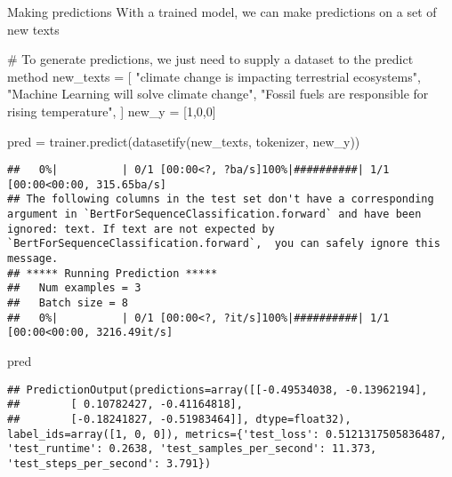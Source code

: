 \documentclass[
  10pt,
  ignorenonframetext,
  aspectratio=169]{beamer}
\newenvironment{Shaded}{\begin{snugshade}}{\end{snugshade}}
\newcommand{\CommentTok}[1]{\textcolor[rgb]{0.50,0.62,0.50}{#1}}
\newcommand{\DecValTok}[1]{\textcolor[rgb]{0.86,0.86,0.80}{#1}}
\newcommand{\NormalTok}[1]{\textcolor[rgb]{0.80,0.80,0.80}{#1}}
\newcommand{\OperatorTok}[1]{\textcolor[rgb]{0.94,0.94,0.82}{#1}}
\newcommand{\StringTok}[1]{\textcolor[rgb]{0.80,0.58,0.58}{#1}}
\begin{document}
\begin{frame}[fragile]{Making predictions}
\protect\hypertarget{making-predictions}{}
With a trained model, we can make predictions on a set of new texts

\medskip
\scriptsize

\begin{Shaded}
\begin{Highlighting}[]
\CommentTok{\# To generate predictions, we just need to supply a dataset to the predict method}
\NormalTok{new\_texts }\OperatorTok{=}\NormalTok{ [}
    \StringTok{"climate change is impacting terrestrial ecosystems"}\NormalTok{,}
    \StringTok{"Machine Learning will solve climate change"}\NormalTok{,}
    \StringTok{"Fossil fuels are responsible for rising temperature"}\NormalTok{,}
\NormalTok{]}
\NormalTok{new\_y }\OperatorTok{=}\NormalTok{ [}\DecValTok{1}\NormalTok{,}\DecValTok{0}\NormalTok{,}\DecValTok{0}\NormalTok{]}

\NormalTok{pred }\OperatorTok{=}\NormalTok{ trainer.predict(datasetify(new\_texts, tokenizer, new\_y))}
\end{Highlighting}
\end{Shaded}

\begin{verbatim}
##   0%|          | 0/1 [00:00<?, ?ba/s]100%|##########| 1/1 [00:00<00:00, 315.65ba/s]
## The following columns in the test set don't have a corresponding argument in `BertForSequenceClassification.forward` and have been ignored: text. If text are not expected by `BertForSequenceClassification.forward`,  you can safely ignore this message.
## ***** Running Prediction *****
##   Num examples = 3
##   Batch size = 8
##   0%|          | 0/1 [00:00<?, ?it/s]100%|##########| 1/1 [00:00<00:00, 3216.49it/s]
\end{verbatim}

\begin{Shaded}
\begin{Highlighting}[]
\NormalTok{pred}
\end{Highlighting}
\end{Shaded}

\begin{verbatim}
## PredictionOutput(predictions=array([[-0.49534038, -0.13962194],
##        [ 0.10782427, -0.41164818],
##        [-0.18241827, -0.51983464]], dtype=float32), label_ids=array([1, 0, 0]), metrics={'test_loss': 0.5121317505836487, 'test_runtime': 0.2638, 'test_samples_per_second': 11.373, 'test_steps_per_second': 3.791})
\end{verbatim}
\end{frame}
\end{document}
